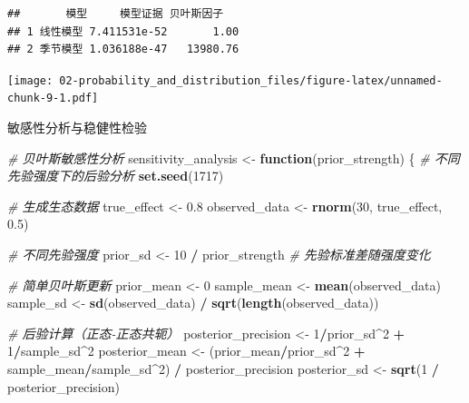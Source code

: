 \documentclass[
  twoside]{book}
\newenvironment{Shaded}{\begin{snugshade}}{\end{snugshade}}
\newcommand{\CommentTok}[1]{\textcolor[rgb]{0.56,0.35,0.01}{\textit{#1}}}
\newcommand{\ControlFlowTok}[1]{\textcolor[rgb]{0.13,0.29,0.53}{\textbf{#1}}}
\newcommand{\DecValTok}[1]{\textcolor[rgb]{0.00,0.00,0.81}{#1}}
\newcommand{\FloatTok}[1]{\textcolor[rgb]{0.00,0.00,0.81}{#1}}
\newcommand{\FunctionTok}[1]{\textcolor[rgb]{0.13,0.29,0.53}{\textbf{#1}}}
\newcommand{\NormalTok}[1]{#1}
\newcommand{\OtherTok}[1]{\textcolor[rgb]{0.56,0.35,0.01}{#1}}
\newcommand{\SpecialCharTok}[1]{\textcolor[rgb]{0.81,0.36,0.00}{\textbf{#1}}}
\begin{document}
\begin{verbatim}
##       模型     模型证据 贝叶斯因子
## 1 线性模型 7.411531e-52       1.00
## 2 季节模型 1.036188e-47   13980.76
\end{verbatim}

\texttt{[image: 02-probability\_and\_distribution\_files/figure-latex/unnamed-chunk-9-1.pdf]}

敏感性分析与稳健性检验

\begin{Shaded}
\begin{Highlighting}[]
\CommentTok{\# 贝叶斯敏感性分析}
\NormalTok{sensitivity\_analysis }\OtherTok{\textless{}{-}} \ControlFlowTok{function}\NormalTok{(prior\_strength) \{}
  \CommentTok{\# 不同先验强度下的后验分析}
  \FunctionTok{set.seed}\NormalTok{(}\DecValTok{1717}\NormalTok{)}

  \CommentTok{\# 生成生态数据}
\NormalTok{  true\_effect }\OtherTok{\textless{}{-}} \FloatTok{0.8}
\NormalTok{  observed\_data }\OtherTok{\textless{}{-}} \FunctionTok{rnorm}\NormalTok{(}\DecValTok{30}\NormalTok{, true\_effect, }\FloatTok{0.5}\NormalTok{)}

  \CommentTok{\# 不同先验强度}
\NormalTok{  prior\_sd }\OtherTok{\textless{}{-}} \DecValTok{10} \SpecialCharTok{/}\NormalTok{ prior\_strength  }\CommentTok{\# 先验标准差随强度变化}

  \CommentTok{\# 简单贝叶斯更新}
\NormalTok{  prior\_mean }\OtherTok{\textless{}{-}} \DecValTok{0}
\NormalTok{  sample\_mean }\OtherTok{\textless{}{-}} \FunctionTok{mean}\NormalTok{(observed\_data)}
\NormalTok{  sample\_sd }\OtherTok{\textless{}{-}} \FunctionTok{sd}\NormalTok{(observed\_data) }\SpecialCharTok{/} \FunctionTok{sqrt}\NormalTok{(}\FunctionTok{length}\NormalTok{(observed\_data))}

  \CommentTok{\# 后验计算（正态{-}正态共轭）}
\NormalTok{  posterior\_precision }\OtherTok{\textless{}{-}} \DecValTok{1}\SpecialCharTok{/}\NormalTok{prior\_sd}\SpecialCharTok{\^{}}\DecValTok{2} \SpecialCharTok{+} \DecValTok{1}\SpecialCharTok{/}\NormalTok{sample\_sd}\SpecialCharTok{\^{}}\DecValTok{2}
\NormalTok{  posterior\_mean }\OtherTok{\textless{}{-}}\NormalTok{ (prior\_mean}\SpecialCharTok{/}\NormalTok{prior\_sd}\SpecialCharTok{\^{}}\DecValTok{2} \SpecialCharTok{+}\NormalTok{ sample\_mean}\SpecialCharTok{/}\NormalTok{sample\_sd}\SpecialCharTok{\^{}}\DecValTok{2}\NormalTok{) }\SpecialCharTok{/}\NormalTok{ posterior\_precision}
\NormalTok{  posterior\_sd }\OtherTok{\textless{}{-}} \FunctionTok{sqrt}\NormalTok{(}\DecValTok{1} \SpecialCharTok{/}\NormalTok{ posterior\_precision)}


\end{Highlighting}
\end{Shaded}
\end{document}

